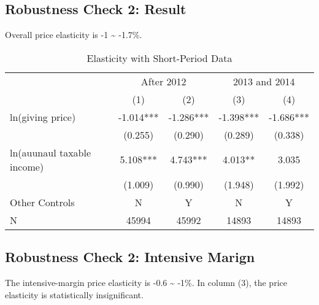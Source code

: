 \documentclass[ review  , 3p ]{elsarticle}
\begin{document}
  \hypertarget{robustness-check-2-result}{%
  \subsection{Robustness Check 2: Result}\label{robustness-check-2-result}}
  
  Overall price elasticity is -1 \textasciitilde{} -1.7\%.
  
  \begin{table}
  
  \caption{\label{tab:kableShortElasticity1}Elasticity with Short-Period Data}
  \centering
  \fontsize{8}{10}\selectfont
  \begin{tabular}[t]{lcccc}
  \toprule
  \multicolumn{1}{c}{ } & \multicolumn{2}{c}{After 2012} & \multicolumn{2}{c}{2013 and 2014} \\
  \cmidrule(l{3pt}r{3pt}){2-3} \cmidrule(l{3pt}r{3pt}){4-5}
   & (1) & (2) & (3) & (4)\\
  \midrule
  ln(giving price) & -1.014*** & -1.286*** & -1.398*** & -1.686***\\
   & (0.255) & (0.290) & (0.289) & (0.338)\\
  ln(auunaul taxable income) & 5.108*** & 4.743*** & 4.013** & 3.035\\
   & (1.009) & (0.990) & (1.948) & (1.992)\\
  Other Controls & N & Y & N & Y\\
  N & 45994 & 45992 & 14893 & 14893\\
  \bottomrule
  \end{tabular}
  \end{table}
  
  \hypertarget{robustness-check-2-intensive-marign}{%
  \subsection{Robustness Check 2: Intensive Marign}\label{robustness-check-2-intensive-marign}}
  
  The intensive-margin price elasticity is -0.6 \textasciitilde{} -1\%.
  In column (3), the price elasticity is statistically insignificant.
  
\end{document}
